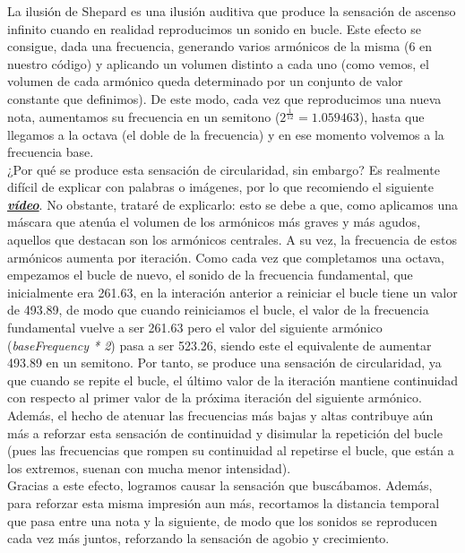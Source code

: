 La ilusión de Shepard es una ilusión auditiva que produce la sensación de ascenso infinito cuando en realidad reproducimos un sonido en bucle. Este efecto se consigue, dada una frecuencia, generando varios armónicos de la misma (6 en nuestro código) y aplicando un volumen distinto a cada uno (como vemos, el volumen de cada armónico queda determinado por un conjunto de valor constante que definimos). De este modo, cada vez que reproducimos una nueva nota, aumentamos su frecuencia en un semitono (\(2^{\frac{1}{12}} = 1.059463\)), hasta que llegamos a la octava (el doble de la frecuencia) y en ese momento volvemos a la frecuencia base.\\

¿Por qué se produce esta sensación de circularidad, sin embargo? Es realmente difícil de explicar con palabras o imágenes, por lo que recomiendo el siguiente \emph{\textbf{\href{https://www.youtube.com/watch?v=ev9hrqkhWsM}{vídeo}}}. No obstante, trataré de explicarlo: esto se debe a que, como aplicamos una máscara que atenúa el volumen de los armónicos más graves y más agudos, aquellos que destacan son los armónicos centrales. A su vez, la frecuencia de estos armónicos aumenta por iteración. Como cada vez que completamos una octava, empezamos el bucle de nuevo, el sonido de la frecuencia fundamental, que inicialmente era 261.63, en la interación anterior a reiniciar el bucle tiene un valor de 493.89, de modo que cuando reiniciamos el bucle, el valor de la frecuencia fundamental vuelve a ser 261.63 pero el valor del siguiente armónico (\emph{baseFrequency * 2}) pasa a ser 523.26, siendo este el equivalente de aumentar 493.89 en un semitono. Por tanto, se produce una sensación de circularidad, ya que cuando se repite el bucle, el último valor de la iteración mantiene continuidad con respecto al primer valor de la próxima iteración del siguiente armónico. Además, el hecho de atenuar las frecuencias más bajas y altas contribuye aún más a reforzar esta sensación de continuidad y disimular la repetición del bucle (pues las frecuencias que rompen su continuidad al repetirse el bucle, que están a los extremos, suenan con mucha menor intensidad).\\

Gracias a este efecto, logramos causar la sensación que buscábamos. Además, para reforzar esta misma impresión aun más, recortamos la distancia temporal que pasa entre una nota y la siguiente, de modo que los sonidos se reproducen cada vez más juntos, reforzando la sensación de agobio y crecimiento.\\

